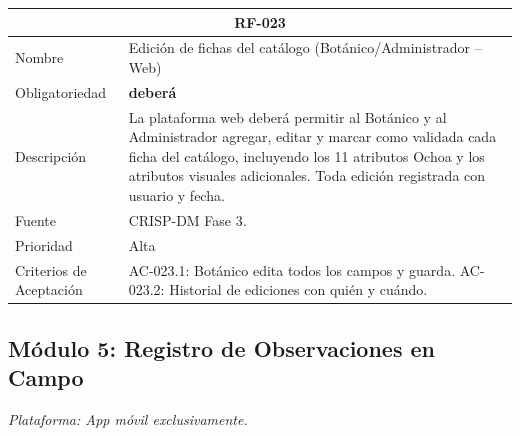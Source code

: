 \documentclass[12pt, a4paper]{article}
\begin{document}
\begin{longtable}{|p{3cm}|p{11.5cm}|}
\hline
\multicolumn{2}{|c|}{\textbf{RF-023}} \\
\hline
Nombre & Edici\'on de fichas del cat\'alogo (Bot\'anico/Administrador -- Web) \\
\hline
Obligatoriedad & \textbf{deber\'a} \\
\hline
Descripci\'on & La plataforma web deber\'a permitir al Bot\'anico y al Administrador agregar, editar y marcar como validada cada ficha del cat\'alogo, incluyendo los 11 atributos Ochoa y los atributos visuales adicionales. Toda edici\'on registrada con usuario y fecha. \\
\hline
Fuente & CRISP-DM Fase 3. \\
\hline
Prioridad & Alta \\
\hline
Criterios de Aceptaci\'on &
AC-023.1: Bot\'anico edita todos los campos y guarda. \newline
AC-023.2: Historial de ediciones con qui\'en y cu\'ando. \\
\hline
\end{longtable}

\subsection{M\'odulo 5: Registro de Observaciones en Campo}

\textit{Plataforma: App m\'ovil exclusivamente.}
\end{document}

